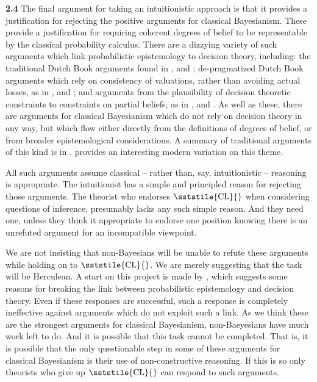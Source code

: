 \textbf{2.4} The final argument for taking an intuitionistic approach is that it provides a justification for rejecting the positive arguments for classical Bayesianism. These provide a justification for requiring coherent degrees of belief to be representable by the classical probability calculus. There are a dizzying variety of such arguments which link probabilistic epistemology to decision theory, including: the traditional Dutch Book arguments found in \citet{RamseyTruthProb}, \citet{Teller1973} and \citet{Lewis1999b}; de-pragmatized Dutch Book arguments which rely on consistency of valuations, rather than avoiding actual losses, as in \citet{HowsonUrbach1989}, \citet{Christensen1996} and \citet{Hellman1997}; and arguments from the plausibility of decision theoretic constraints to constraints on partial beliefs, as in \citet{Savage1954}, \citet{Maher1993} and \citet{Kaplan1996}. As well as these, there are arguments for classical Bayesianism which do not rely on decision theory in any way, but which flow either directly from the definitions of degrees of belief, or from broader epistemological considerations. A summary of traditional arguments of this kind is in \citet{Paris1994}. \citet{Joyce1998} provides an interesting modern variation on this theme.

All such arguments assume classical -- rather than, say, intuitionistic -- reasoning is appropriate. The intuitionist has a simple and principled reason for rejecting those arguments. The theorist who endorses {\small \(\sststile{\mathrm{CL}}{}\)} when considering questions of inference, presumably lacks any such simple reason. And they need one, unless they think it appropriate to endorse one position knowing there is an unrefuted argument for an incompatible viewpoint.

We are not insisting that non-Bayesians will be unable to refute these arguments while holding on to {\small \(\sststile{\mathrm{CL}}{}\)}. We are merely suggesting that the task will be Herculean. A start on this project is made by \citet{Shafer1981}, which suggests some reasons for breaking the link between probabilistic epistemology and decision theory. Even if these responses are successful, such a response is completely ineffective against arguments which do not exploit such a link. As we think these are the strongest arguments for classical Bayesianism, non-Baeyesians have much work left to do. And it is possible that this task cannot be completed. That is, it is possible that the only questionable step in some of these arguments for classical Bayesianism is their use of non-constructive reasoning. If this is so only theorists who give up {\small \(\sststile{\mathrm{CL}}{}\)} can respond to such arguments.

